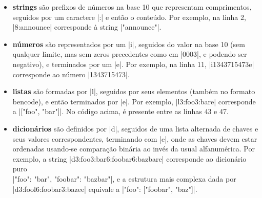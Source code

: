 \begin{itemize}
    \item \textbf{\glspl*{string}} são prefixos de números na base 10 que representam
        comprimentos, seguidos por um caractere \bverb|:| e então o conteúdo. Por
        exemplo, na linha 2, \bverb|8:announce| corresponde à \gls*{string}
        \sverb|"announce"|.

    \item \textbf{números} são representados por um \bverb|i|, seguidos do valor na
        base 10 (sem qualquer limite, mas sem zeros precedentes como em \bverb|0003|, e
        podendo ser negativo), e terminados por um \bverb|e|. Por exemplo, na linha 11,
        \bverb|i1343715473e| corresponde ao número \sverb|1343715473|.

    \item \textbf{listas} são formadas por \bverb|l|, seguidos por seus elementos
        (também no formato \gls*{bencode}), e então terminados por \bverb|e|. Por
        exemplo, \bverb|l3:foo3:bare| corresponde a \sverb|["foo", "bar"]|. No código
        acima, é presente entre as linhas 43 e 47.

    \item \textbf{dicionários} são definidos por \bverb|d|, seguidos de uma lista
        alternada de chaves e seus valores correspondentes, terminando com \bverb|e|,
        onde as chaves devem estar ordenadas usando-se comparação binária ao invés da
        usual alfanumérica. Por exemplo, a \gls*{string}
        \bverb|d3:foo3:bar6:foobar6:bazbare| corresponde ao dicionário puro \\
        \sverb|{"foo": "bar", "foobar": "bazbar"}|, e a estrutura mais complexa dada por
        \\ \bverb|d3:fool6:foobar3:bazee| equivale a \sverb|{"foo": ["foobar", "baz"]}|.
\end{itemize}

